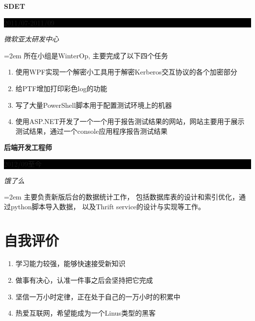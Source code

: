 \documentclass[paper=a4,fontsize=11pt]{scrartcl}	 			%
\newcommand{\sepspace}{\vspace*{1em}}			%
\newcommand{\NewPart}[1]{\section*{\uppercase{#1}}}
\newcommand{\EducationEntry}[4]{
		\noindent \textbf{#1} \hfill 					%
		\colorbox{Black}{%
			\parbox{8em}{%
			\hfill\color{White}#2}} \par				%
		\noindent \textit{#3} \par					%
		\noindent\hangindent=2em\hangafter=0  #4 	%
		\normalsize \par}
\begin{document}
\begin{CJK}{UTF8}{gbsn}
\EducationEntry{SDET}{2011/07-2011/09}{微软亚太研发中心}
{所在小组是WinterOp, 主要完成了以下四个任务
\begin{enumerate}
        \item 使用WPF实现一个解密小工具用于解密Kerberos交互协议的各个加密部分
        \item 给PTF增加打印彩色log的功能
        \item 写了大量PowerShell脚本用于配置测试环境上的机器
        \item 使用ASP.NET开发了一个一个用于报告测试结果的网站，网站主要用于展示测试结果，通过一个console应用程序报告测试结果
\end{enumerate}
}
\sepspace

\EducationEntry{后端开发工程师}{2012/09至今}{饿了么}
{主要负责新版后台的数据统计工作，
包括数据库表的设计和索引优化，通过python脚本导入数据，
以及Thrift service的设计与实现等工作。
}

\NewPart{自我评价}{}
\begin{enumerate}
\item 学习能力较强，能够快速接受新知识
\item 做事有决心，认准一件事之后会坚持把它完成
\item 坚信一万小时定律，正在处于自己的一万小时的积累中
\item 热爱互联网，希望能成为一个Linus类型的黑客
\end{enumerate}
\end{CJK}
\end{document}
